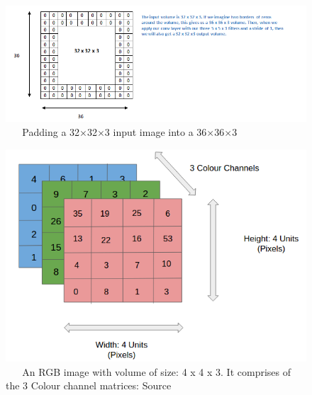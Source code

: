 \documentclass[master]{thesis-uestc}
\begin{document}
\begin{figure}[ht]
\includegraphics[width=7in]{pic/padding.png}
\caption{\,\,\,\,\,\,\,\,\,\,Padding a 32$\times$32$\times$3 input image into a 36$\times$36$\times$3}
\label{fig_padding}
\end{figure}

\begin{figure}[ht]
\includegraphics[width=5in]{pic/rgb_image.png}
\caption{\,\,\,\,\,\,\,\,\,\,An RGB image with volume of size: 4 x 4 x 3. It comprises of the 3 Colour channel matrices: Source \cite{Abhineet}}
\label{rgb_image}
\end{figure}
\end{document}
